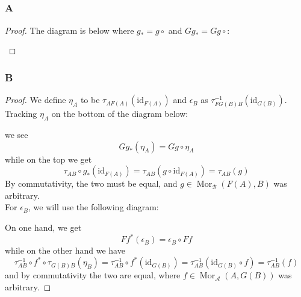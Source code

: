 \documentclass{article}
\newcommand{\id}{\mathrm{id}}
\newcommand{\fA}{\mathscr{A}}
\newcommand{\fB}{\mathscr{B}}
\DeclareMathOperator{\Mor}{Mor}
\begin{document}
\subsection{}
\subsubsection{A}\label{1.5.A}
\begin{proof}
The diagram is below where $g_*=g\circ$ and $Gg_*=Gg\circ $:
    \begin{center}
    \end{center}
    
\end{proof}
\subsubsection{B}\label{1.5.B}
\begin{proof}
    We define $\eta_A$ to be $\tau_{AF(A)}(\id_{F(A)})$ and $\epsilon_B$ as $\tau_{FG(B)B}^{-1}(\id_{G(B)})$. Tracking $\eta_A$ on the bottom of the diagram below: 
    \begin{center}
    \end{center}
    we see
    \[
    Gg_*(\eta_A)=Gg\circ \eta_A
    \]
    while on the top we get
    \[
    \tau_{AB}\circ g_*(\id_{F(A)})=\tau_{AB}(g\circ \id_{F(A)})=\tau_{AB}(g)
    \]
    By commutativity, the two must be equal, and $g\in \Mor_\fB(F(A),B)$ was arbitrary.\\
    \newline
    For $\epsilon_B$, we will use the following diagram:
    \begin{center}
    \end{center}
    On one hand, we get
    \[
    Ff^*(\epsilon_B)=\epsilon_B\circ Ff
    \]
    while on the other hand we have
    \[
    \tau_{AB}^{-1}\circ f^*\circ \tau_{G(B)B}(\eta_B)=\tau_{AB}^{-1}\circ f^*(\id_{G(B)})=\tau_{AB}^{-1}(\id_{G(B)}\circ f)=\tau_{AB}^{-1}(f)
    \]
    and by commutativity the two are equal, where $f\in \Mor_\fA(A,G(B))$ was arbitrary.
\end{proof}
\end{document}
